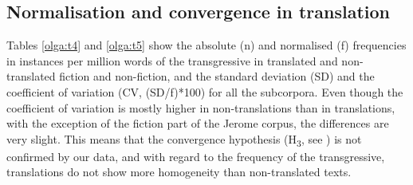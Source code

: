 \documentclass[output=paper,russian]{langsci/langscibook}
\begin{document}
\subsection{Normalisation and convergence in translation}\label{olga:ananc}

Tables \ref{olga:t4} and \ref{olga:t5} show the absolute (n) and normalised (f) frequencies in instances per million words of the transgressive in translated and non-translated fiction and non-fiction, and the standard deviation (SD) and the coefficient of variation (CV, (SD/f)*100) for all the subcorpora. Even though the coefficient of variation is mostly higher in non-translations than in translations, with the exception of the fiction part of the Jerome corpus, the differences are very slight. This means that the convergence hypothesis (H\textsubscript{3}, see ) is not confirmed by our data, and with regard to the frequency of the transgressive, translations do not show more homogeneity than non-translated texts.

\begin{table}\caption{Frequencies of the transgressive (both forms) in fiction (n = absolute frequency, f = normalised frequency in instances per million words, CV = coefficient of variation)}\label{olga:t4}
\end{table}
\end{document}
